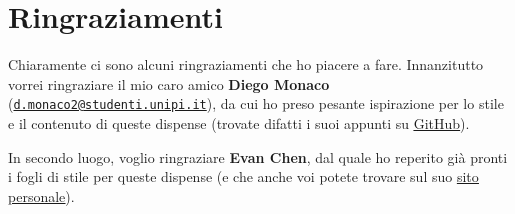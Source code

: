 \documentclass[11pt]{scrartcl}
\begin{document}
\section*{Ringraziamenti}

Chiaramente ci sono alcuni ringraziamenti che ho piacere a fare. Innanzitutto
vorrei ringraziare il mio caro amico \textbf{Diego Monaco}
(\texttt{\href{mailto:d.monaco2@studenti.unipi.it}{d.monaco2@studenti.unipi.it}}),
da cui ho preso pesante ispirazione per lo stile e il contenuto di queste dispense
(trovate difatti i suoi appunti su \underline{\href{https://github.com/diego-unipi/Appunti-Aritmetica}{GitHub}}).

In secondo luogo, voglio ringraziare \textbf{Evan Chen}, dal quale ho reperito
già pronti i fogli di stile per queste dispense (e che anche voi potete trovare
sul suo \underline{\href{https://web.evanchen.cc/faq-latex.html}{sito personale}}).

\newpage
\tableofcontents


\end{document}
